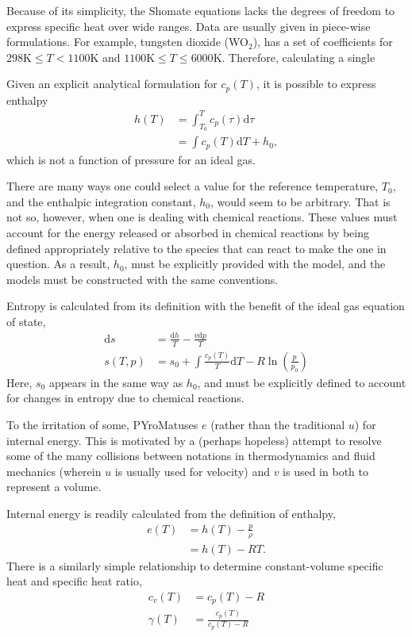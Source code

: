 \documentclass[twocolumn,letterpaper,11pt]{article}
\def\pm{PYroMat}
\def\d{\mathrm{d}}
\begin{document}
Because of its simplicity, the Shomate equations lacks the degrees of freedom to express specific heat over wide ranges.  Data are usually given in piece-wise formulations.  For example, tungsten dioxide (WO$_2$), has a set of coefficients for $298\mathrm{K} \le T < 1100\mathrm{K}$ and $1100\mathrm{K} \le T \le 6000\mathrm{K}$.  Therefore, calculating a single 


Given an explicit analytical formulation for $c_p(T)$, it is possible to express enthalpy
\begin{align}
h(T) &= \int_{T_0}^T c_p(\tau) \d \tau \nonumber\\
 &= \int c_p(T) \d T + h_0,
\end{align}
which is not a function of pressure for an ideal gas.

There are many ways one could select a value for the reference temperature, $T_0$, and the enthalpic integration constant, $h_0$, would seem to be arbitrary.  That is not so, however, when one is dealing with chemical reactions.  These values must account for the energy released or absorbed in chemical reactions by being defined appropriately relative to the species that can react to make the one in question.  As a result, $h_0$, must be explicitly provided with the model, and the models must be constructed with the same conventions.

Entropy is calculated from its definition with the benefit of the ideal gas equation of state,
\begin{align} 
\d s &= \frac{\d h}{T} - \frac{v \d p}{T}\nonumber\\
s(T,p) &= s_0 + \int \frac{c_p(T)}{T} \d T - R \ln\left(\frac{p}{p_0}\right)
\end{align}
Here, $s_0$ appears in the same way as $h_0$, and must be explicitly defined to account for changes in entropy due to chemical reactions.

To the irritation of some, \pm uses $e$ (rather than the traditional $u$) for internal energy.  This is motivated by a (perhaps hopeless) attempt to resolve some of the many collisions between notations in thermodynamics and fluid mechanics (wherein $u$ is usually used for velocity) and $v$ is used in both to represent a volume.  

Internal energy is readily calculated from the definition of enthalpy,
\begin{align}
e(T) &= h(T) - \frac{p}{\rho}\nonumber\\
 &= h(T) - R T.
\end{align}
There is a similarly simple relationship to determine constant-volume specific heat and specific heat ratio,
\begin{align}
c_v(T) &= c_p(T) - R\\
\gamma(T) &= \frac{c_p(T)}{c_p(T)-R}
\end{align}
\end{document}
